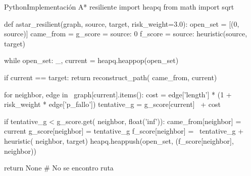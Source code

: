 \documentclass[conference]{IEEEtran}
\begin{document}
\begin{mycode}{Python}{Implementación A* resiliente}
import heapq
from math import sqrt

def astar_resilient(graph, source, target,
                    risk_weight=3.0):
    open_set = [(0, source)]
    came_from = {}
    g_score = {source: 0}
    f_score = {source: heuristic(source,
                                  target)}

    while open_set:
        _, current = heapq.heappop(open_set)

        if current == target:
            return reconstruct_path(
                came_from, current)

        for neighbor, edge in \
                graph[current].items():
            cost = edge['length'] * (1 +
                risk_weight * edge['p_fallo'])
            tentative_g = g_score[current] \
                          + cost

            if tentative_g < g_score.get(
                    neighbor, float('inf')):
                came_from[neighbor] = current
                g_score[neighbor] = tentative_g
                f_score[neighbor] = \
                    tentative_g + heuristic(
                        neighbor, target)
                heapq.heappush(open_set,
                    (f_score[neighbor],
                     neighbor))

    return None  # No se encontro ruta
\end{mycode}
\end{document}
